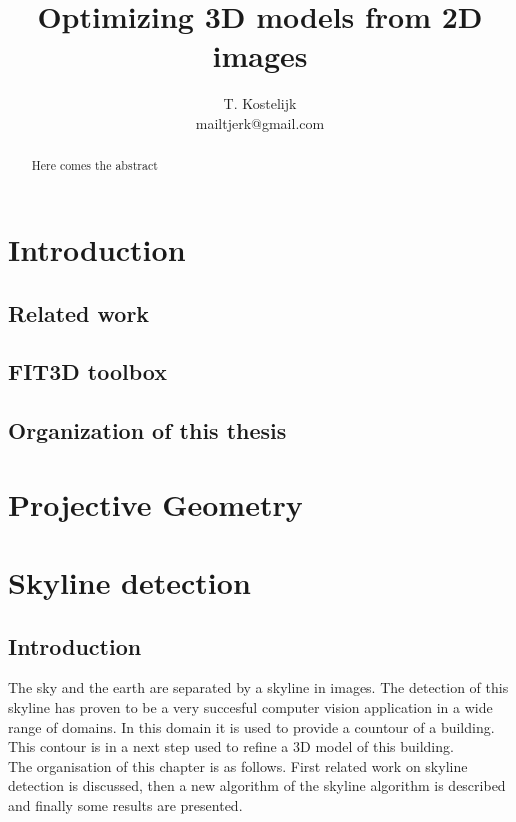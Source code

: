 \documentclass[10pt]{article}
\title{\sc Optimizing 3D models from 2D images}
\author{T. Kostelijk\\mailtjerk@gmail.com}
\begin{document}
\maketitle

\begin{abstract}
Here comes the abstract
\end{abstract}




\section{Introduction}
 \subsection{Related work}
 \subsection{FIT3D toolbox}
 \subsection{Organization of this thesis}

\section{Projective Geometry}

\section{Skyline detection}
 \subsection{Introduction}

The sky and the earth are separated by a skyline in images. The detection of this skyline
has proven to be a very succesful computer vision application in a wide range of
domains. In this domain it is used to provide a countour of a building. This
contour is in a next step used to refine a 3D model of this building.\\
The organisation of this chapter is as follows.  First related work on skyline
detection is discussed, then a new algorithm of the skyline algorithm is
described and finally some results are presented.\\
\end{document}
